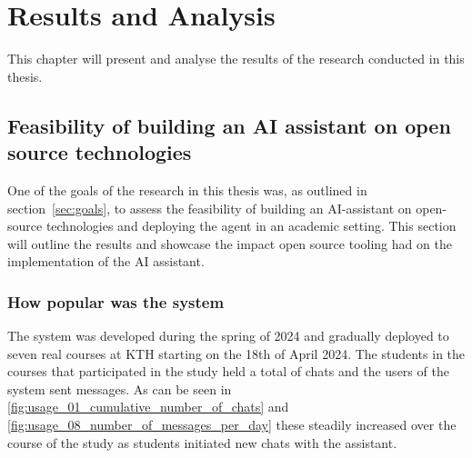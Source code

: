 ﻿\chapter{Results and Analysis}
\label{ch:resultsAndAnalysis}




This chapter will present and analyse the results of the research conducted in this thesis.






\section{Feasibility of building an AI assistant on open source technologies}


One of the goals of the research in this thesis was, as outlined in section~\ref{sec:goals}, to assess the feasibility of building an AI-assistant on open-source technologies and deploying the agent in an academic setting. This section will outline the results and showcase the impact open source tooling had on the implementation of the AI assistant.


\subsection{How popular was the system}


The system was developed during the spring of 2024 and gradually deployed to seven real courses at KTH starting on the 18th of April 2024. The students in the courses that participated in the study held a total of chats and the users of the system sent messages. As can be seen in \autoref{fig:usage_01_cumulative_number_of_chats} and \autoref{fig:usage_08_number_of_messages_per_day} these steadily increased over the course of the study as students initiated new chats with the assistant.


